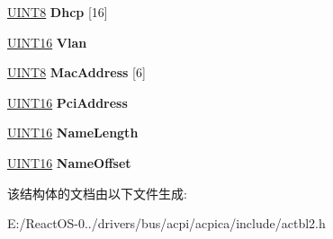 \begin{DoxyCompactItemize}
\item 
\mbox{\label{structacpi__ibft__nic_ae217285804fcbf2b40438bb20c13acdf}} 
\hyperlink{_processor_bind_8h_ab27e9918b538ce9d8ca692479b375b6a}{U\+I\+N\+T8} {\bfseries Dhcp} \mbox{[}16\mbox{]}
\item 
\mbox{\label{structacpi__ibft__nic_a5a3ef5df7df89a1dcb593d52379a3462}} 
\hyperlink{_processor_bind_8h_a09f1a1fb2293e33483cc8d44aefb1eb1}{U\+I\+N\+T16} {\bfseries Vlan}
\item 
\mbox{\label{structacpi__ibft__nic_a129f192f63766eee2ef650d529350c9d}} 
\hyperlink{_processor_bind_8h_ab27e9918b538ce9d8ca692479b375b6a}{U\+I\+N\+T8} {\bfseries Mac\+Address} \mbox{[}6\mbox{]}
\item 
\mbox{\label{structacpi__ibft__nic_af90abd9127cf566bab90b3d82b7e4890}} 
\hyperlink{_processor_bind_8h_a09f1a1fb2293e33483cc8d44aefb1eb1}{U\+I\+N\+T16} {\bfseries Pci\+Address}
\item 
\mbox{\label{structacpi__ibft__nic_a5c5ef2eb4f7736fca9e5f553158e675d}} 
\hyperlink{_processor_bind_8h_a09f1a1fb2293e33483cc8d44aefb1eb1}{U\+I\+N\+T16} {\bfseries Name\+Length}
\item 
\mbox{\label{structacpi__ibft__nic_a568fc38b58f0f96b90bd7a7e7491a509}} 
\hyperlink{_processor_bind_8h_a09f1a1fb2293e33483cc8d44aefb1eb1}{U\+I\+N\+T16} {\bfseries Name\+Offset}
\end{DoxyCompactItemize}


该结构体的文档由以下文件生成\+:\begin{DoxyCompactItemize}
\item 
E\+:/\+React\+O\+S-\/0../drivers/bus/acpi/acpica/include/actbl2.\+h\end{DoxyCompactItemize}

